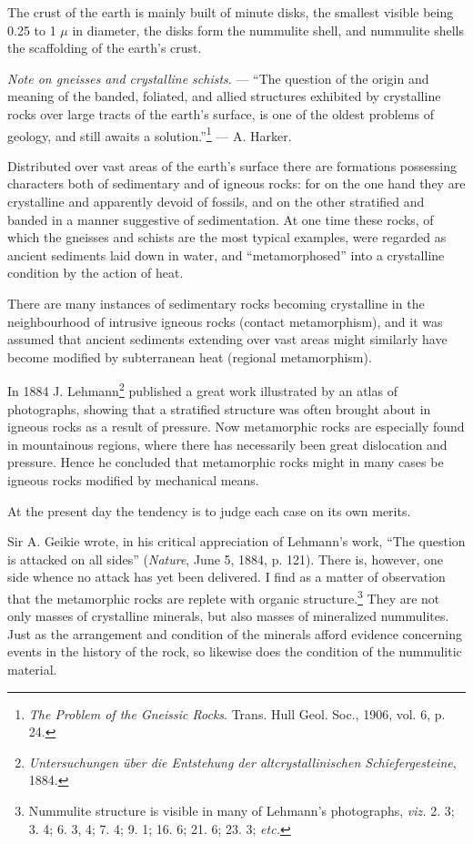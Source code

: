 \documentclass[a4paper, 12pt, oneside]{article}
\begin{document}
The crust of the earth is mainly built of minute disks, the smallest visible being 0.25 to 1 $\mu$ in diameter, the disks form the nummulite shell, and nummulite shells the scaffolding of the earth's crust.

\emph{Note on gneisses and crystalline schists}. --- ``The question of the origin and meaning of the banded, foliated, and allied structures exhibited by crystalline rocks over large tracts of the earth's surface, is one of the oldest problems of geology, and still awaits a solution.''\footnote{\emph{The Problem of the Gneissic Rocks}. Trans. Hull Geol. Soc., 1906, vol. 6, p. 24.} --- A. Harker.

Distributed over vast areas of the earth's surface there are formations possessing characters both of sedimentary and of igneous rocks: for on the one hand they are crystalline and apparently devoid of fossils, and on the other stratified and banded in a manner suggestive of sedimentation. At one time these rocks, of which the gneisses and schists are the most typical examples, were regarded as ancient sediments laid down in water, and ``metamorphosed'' into a crystalline condition by the action of heat.

There are many instances of sedimentary rocks becoming crystalline in the neighbourhood of intrusive igneous rocks (contact metamorphism), and it was assumed that ancient sediments extending over vast areas might similarly have become modified by subterranean heat (regional metamorphism).

In 1884 J. Lehmann\footnote{\emph{Untersuchungen über die Entstehung der altcrystallinischen Schiefergesteine}, 1884.} published a great work illustrated by an atlas of photographs, showing that a stratified structure was often brought about in igneous rocks as a result of pressure. Now metamorphic rocks are especially found in mountainous regions, where there has necessarily been great dislocation and pressure. Hence he concluded that metamorphic rocks might in many cases be igneous rocks modified by mechanical means.

At the present day the tendency is to judge each case on its own merits.

Sir A. Geikie wrote, in his critical appreciation of Lehmann's work, ``The question is attacked on all sides'' (\emph{Nature}, June 5, 1884, p. 121). There is, however, one side whence no attack has yet been delivered. I find as a matter of observation that the metamorphic rocks are replete with organic structure.\footnote{Nummulite structure is visible in many of Lehmann's photographs, \emph{viz.} 2. 3; 3. 4; 6. 3, 4; 7. 4; 9. 1; 16. 6; 21. 6; 23. 3; \emph{etc.}} They are not only masses of crystalline minerals, but also masses of mineralized nummulites. Just as the arrangement and condition of the minerals afford evidence concerning events in the history of the rock, so likewise does the condition of the nummulitic material.
\end{document}
